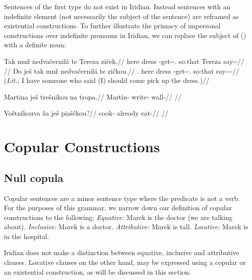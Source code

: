 Sentences of the first type do not exist in Iridian. Instead sentences with an indefinite element (not necessarily the subject of the sentence) are reframed as existential constructions. To further illustrate the primacy of impersonal constructions over indefinite pronouns in Iridian, we can replace the subject of () with a definite noun:

\pex
\a\begingl
    \gla Tak mu\v{z} nedva\v{c}ernil\'a te Tereza zi\v{c}ek.//
    \glb here dress \Caus{}-get-\Pv{}-\Subj{}.\Ipf{} so:that Tereza say-\Av{}-\Pf{}//
    \glft {}//
  \endgl
\a\begingl
    \gla Do je\v{s} tak mu\v{z} nedva\v{c}ernil\'a te zi\v{c}kou.//
    \glb \First{}\Sg{}.\Pat{} \Exst{} here dress \Caus{}-get-\Pv{}-\Subj{}.\Ipf{} so:that say-\Av{}-\Pf{}-\Nz{}//
    \glft {} (\emph{Lit.,} I have someone who said (I) should come pick up the dress.)//
  \endgl
\xe


\pex
\begingl
\gla Martina ješ trešnikou na tropa.//
\glb Martin-\Pat{} \Exst{} write- \Loc{} wall-\Pat{}//
\glft {}//
\endgl
\xe

\pex
\begingl
\gla Voštnikouva \v{z}a ješ piaščkou?//
\glb cook- already \Exst{} eat-//
\glft {}//
\endgl
\xe

\section{Copular Constructions}
\subsection{Null copula}

Copular sentences are a minor sentence type where the predicate is not a verb. For the purposes of this grammar, we narrow down our definition of copular constructions to the following:
\pex
\a \textit{Equative:} Marek is the doctor (we are talking about).
\a \textit{Inclusive:} Marek is a doctor.
\a \textit{Attributive:} Marek is tall.
\a \textit{Locative:} Marek is in the hospital.
\xe

Iridian does not make a distinction between equative, inclusive and attributive clauses. Locative clauses on the other hand, may be expressed using a copular or an existential construction, as will be discussed in this section.

